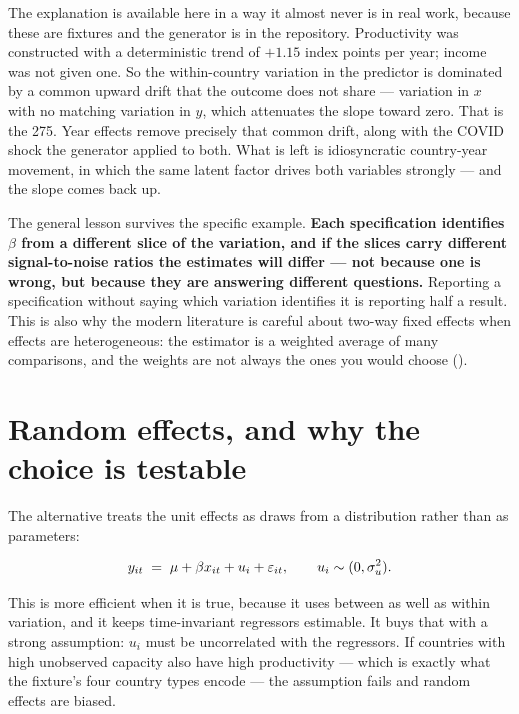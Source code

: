 \documentclass[
  letterpaper,
  10pt,
  twoside,
  openright,
  numbers=noenddot,
  chapterprefix=true]{scrbook}
\begin{document}
The explanation is available here in a way it almost never is in real
work, because these are fixtures and the generator is in the repository.
Productivity was constructed with a deterministic trend of \(+1.15\)
index points per year; income was not given one. So the within-country
variation in the predictor is dominated by a common upward drift that
the outcome does not share --- variation in \(x\) with no matching
variation in \(y\), which attenuates the slope toward zero. That is the
275. Year effects remove precisely that common drift, along with the
COVID shock the generator applied to both. What is left is idiosyncratic
country-year movement, in which the same latent factor drives both
variables strongly --- and the slope comes back up.

The general lesson survives the specific example. \textbf{Each
specification identifies \(\beta\) from a different slice of the
variation, and if the slices carry different signal-to-noise ratios the
estimates will differ --- not because one is wrong, but because they are
answering different questions.} Reporting a specification without saying
which variation identifies it is reporting half a result. This is also
why the modern literature is careful about two-way fixed effects when
effects are heterogeneous: the estimator is a weighted average of many
comparisons, and the weights are not always the ones you would choose
().

\section{Random effects, and why the choice is
testable}\label{random-effects-and-why-the-choice-is-testable}

The alternative treats the unit effects as draws from a distribution
rather than as parameters:

\[
y_{it} \thickspace=\thickspace \mu + \beta x_{it} + u_i + \varepsilon_{it},
\qquad u_i \sim (0, \sigma_u^2) .
\]

This is more efficient when it is true, because it uses between as well
as within variation, and it keeps time-invariant regressors estimable.
It buys that with a strong assumption: \(u_i\) must be uncorrelated with
the regressors. If countries with high unobserved capacity also have
high productivity --- which is exactly what the fixture's four country
types encode --- the assumption fails and random effects are biased.
\end{document}
